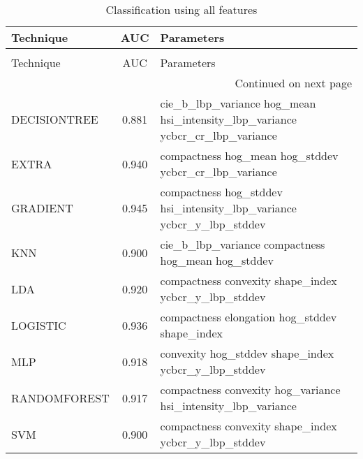\begin{longtable}{lcl}
\caption[Classification using all features]{Classification using all features}
\label{table:optimal}\\
\toprule
Technique &   AUC &                                                                   Parameters \\
\midrule
\endfirsthead
\caption[]{Classification using all features} \\
\toprule
Technique &   AUC &                                                                   Parameters \\
\midrule
\endhead
\midrule
\multicolumn{3}{r}{{Continued on next page}} \\
\midrule
\endfoot

\bottomrule
\endlastfoot
DECISIONTREE & 0.881 & \begin{minipage}[t]{0.5\textwidth}  cie\_b\_lbp\_variance hog\_mean hsi\_intensity\_lbp\_variance ycbcr\_cr\_lbp\_variance \end{minipage}\\
\midrule
EXTRA & 0.940 &   \begin{minipage}[t]{0.5\textwidth}                      compactness hog\_mean hog\_stddev ycbcr\_cr\_lbp\_variance \end{minipage}\\
\midrule
GRADIENT & 0.945 &   \begin{minipage}[t]{0.5\textwidth}       compactness hog\_stddev hsi\_intensity\_lbp\_variance ycbcr\_y\_lbp\_stddev \end{minipage} \\
\midrule
KNN & 0.900 &   \begin{minipage}[t]{0.5\textwidth}                         cie\_b\_lbp\_variance compactness hog\_mean hog\_stddev \end{minipage}\\
\midrule
LDA & 0.920 &   \begin{minipage}[t]{0.5\textwidth}                        compactness convexity shape\_index ycbcr\_y\_lbp\_stddev \end{minipage}\\
\midrule
LOGISTIC & 0.936 &   \begin{minipage}[t]{0.5\textwidth}                              compactness elongation hog\_stddev shape\_index \end{minipage}\\
\midrule
MLP & 0.918 &      \begin{minipage}[t]{0.5\textwidth}                    convexity hog\_stddev shape\_index ycbcr\_y\_lbp\_stddev \end{minipage}\\
\midrule
RANDOMFOREST & 0.917 &  \begin{minipage}[t]{0.5\textwidth}               compactness convexity hog\_variance hsi\_intensity\_lbp\_variance \end{minipage}\\
\midrule
SVM & 0.900 &  \begin{minipage}[t]{0.5\textwidth}                       compactness convexity shape\_index ycbcr\_y\_lbp\_stddev \end{minipage}\\
\end{longtable}

